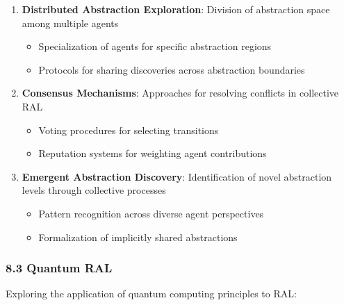 \documentclass[
]{article}
\providecommand{\tightlist}{%
  \setlength{\itemsep}{0pt}\setlength{\parskip}{0pt}}
\begin{document}
\begin{enumerate}
\def\labelenumi{\arabic{enumi}.}
\tightlist
\item
  \textbf{Distributed Abstraction Exploration}: Division of abstraction
  space among multiple agents

  \begin{itemize}
  \tightlist
  \item
    Specialization of agents for specific abstraction regions
  \item
    Protocols for sharing discoveries across abstraction boundaries
  \end{itemize}
\item
  \textbf{Consensus Mechanisms}: Approaches for resolving conflicts in
  collective RAL

  \begin{itemize}
  \tightlist
  \item
    Voting procedures for selecting transitions
  \item
    Reputation systems for weighting agent contributions
  \end{itemize}
\item
  \textbf{Emergent Abstraction Discovery}: Identification of novel
  abstraction levels through collective processes

  \begin{itemize}
  \tightlist
  \item
    Pattern recognition across diverse agent perspectives
  \item
    Formalization of implicitly shared abstractions
  \end{itemize}
\end{enumerate}

\subsubsection{8.3 Quantum RAL}\label{quantum-ral}

Exploring the application of quantum computing principles to RAL:
\end{document}
